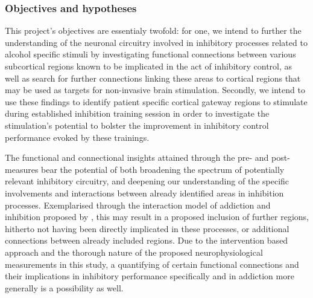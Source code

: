 \documentclass[12pt]{article}
\begin{document}
\subsubsection{Objectives and hypotheses}

This project's objectives are essentialy twofold: for one, we intend to further the understanding of the neuronal circuitry involved in inhibitory processes related to alcohol specific stimuli by investigating functional connections between various subcortical regions known to be implicated in the act of inhibitory control, as well as search for further connections linking these areas to cortical regions that may be used as targets for non-invasive brain stimulation. Secondly, we intend to use these findings to identify patient specific cortical gateway regions to stimulate during established inhibition training session in order to investigate the stimulation's potential to bolster the improvement in inhibitory control performance evoked by these trainings.

The functional and connectional insights attained through the pre- and post-measures bear the potential of both broadening the spectrum of potentially relevant inhibitory circuitry, and deepening our understanding of the specific involvements and interactions between already identified areas in inhibition processes. Exemplarised through the interaction model of addiction and inhibition proposed by \textcite{volkowAddictionScienceUncovering2014}, this may result in a proposed inclusion of further regions, hitherto not having been directly implicated in these processes, or additional connections between already included regions. Due to the intervention based approach and the thorough nature of the proposed neurophysiological measurements in this study, a quantifying of certain functional connections and their implications in inhibitory performance specifically and in addiction more generally is a possibility as well.
\end{document}
